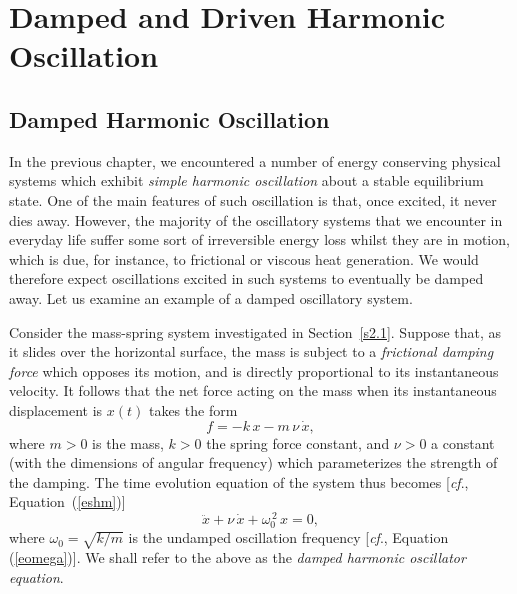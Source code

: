 \chapter{Damped and Driven Harmonic Oscillation}

\section{Damped Harmonic Oscillation}\label{s3.1}
In the previous chapter, we encountered a number of energy conserving physical systems which
exhibit {\em simple harmonic oscillation}\/ about a stable equilibrium state. One of
the main features of such oscillation is that,  once 
excited, it never dies away. However, the majority of the  oscillatory 
systems that we  encounter in everyday life suffer some sort of irreversible energy loss whilst they are in motion, which is due, for instance,  to frictional or viscous heat generation. We would therefore expect oscillations excited in such  systems  
to eventually  be damped away. Let us examine an example of a
damped oscillatory system.

Consider the mass-spring system investigated in Section~\ref{s2.1}.
Suppose that, as it slides over the horizontal surface,  the mass is subject to
a {\em frictional damping force}\/ which opposes its motion, and is directly
proportional to its instantaneous velocity. It follows that the net force acting
on the mass when its instantaneous displacement is $x(t)$ takes the form
\begin{equation}\label{e3.1}
f = - k\,x -m\,\nu\,\dot{x},
\end{equation}
where $m>0$ is the  mass, $k>0$ the spring force constant, and $\nu>0$  a constant (with the dimensions of angular frequency)  which parameterizes the strength of the damping. The time evolution equation of the
system thus becomes [{\em cf}., Equation~(\ref{eshm})]
\begin{equation}\label{e3.2}
\ddot{x} + \nu\,\dot{x} + \omega_0^{\,2}\,x = 0,
\end{equation}
where $\omega_0=\sqrt{k/m}$ is the undamped oscillation frequency [{\em cf}., Equation (\ref{eomega})]. We  shall
refer to the above as the {\em damped harmonic oscillator equation}.

